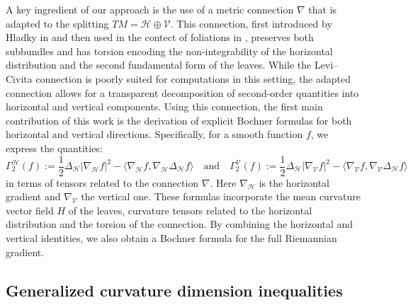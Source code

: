 \documentclass[11pt]{article}
\numberwithin{equation}{section}
\newcommand{\Ho}{\mathcal H}
\newcommand{\V}{\mathcal V}
\begin{document}
\medskip

A key ingredient of our approach is the use of a metric connection $\nabla$ that is adapted to the splitting $TM=\mathcal H\oplus\mathcal V$. This connection, first introduced by Hladky in \cite{Hladky} and then used in the contect of foliations in \cite{AGAG,2025arXiv250913276B}, preserves both subbundles and has torsion encoding  the non-integrability of the horizontal distribution and the second fundamental form of the leaves. While the Levi--Civita connection is poorly suited for computations in this setting, the adapted connection allows for a transparent decomposition of second-order quantities into horizontal and vertical components.  Using this connection, the first main contribution of this work is the derivation of explicit Bochner formulas for both horizontal and vertical directions. Specifically, for a smooth function $f$, we express the quantities:
\[ 
\Gamma_2^{\mathcal H}(f):=\frac{1}{2}\Delta_{\mathcal{H}}|\nabla_{\mathcal{H}}f|^{2}-\langle\nabla_{\mathcal{H}}f,\nabla_{\mathcal{H}}\Delta_{\mathcal{H}}f\rangle \quad \text{and} \quad \Gamma_2^{\mathcal V}(f):=\frac{1}{2}\Delta_{\mathcal{H}}|\nabla_{\mathcal{V}}f|^{2}-\langle\nabla_{\mathcal{V}}f,\nabla_{\mathcal{V}}\Delta_{\mathcal{H}}f\rangle \]
in terms of tensors related to the connection $\nabla$. Here $\nabla_\Ho$ is the horizontal gradient and $\nabla_\V$ the vertical one. These formulas incorporate the mean curvature vector field $H$ of the leaves, curvature tensors related to the horizontal distribution and the torsion of the connection. By combining the horizontal and vertical identities, we also obtain a Bochner formula for the full Riemannian gradient.

\subsection{Generalized curvature dimension inequalities}
\end{document}
